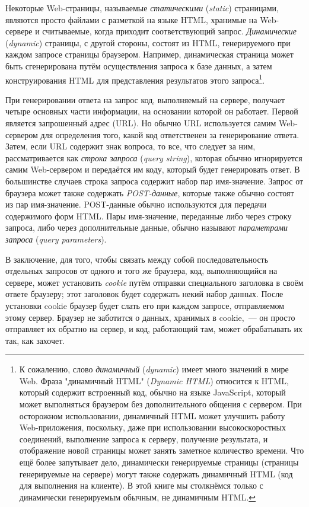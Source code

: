 Некоторые Web-страницы, называемые \textit{статическими} (\textit{static}) страницами,
являются просто файлами с разметкой на языке HTML, хранимые на Web-сервере и считываемые,
когда приходит соответствующий запрос. \textit{Динамические} (\textit{dynamic}) страницы,
с другой стороны, состоят из HTML, генерируемого при каждом запросе страницы
браузером. Например, динамическая страница может быть сгенерирована путём осуществления
запроса к базе данных, а затем конструирования HTML для представления результатов этого
запроса\footnote{К сожалению, слово \textit{динамичный} (\textit{dynamic}) имеет много
  значений в мире Web. Фраза "динамичный HTML" (\textit{Dynamic HTML}) относится к HTML,
  который содержит встроенный код, обычно на языке JavaScript, который может выполняться
  браузером без дополнительного общения с сервером. При осторожном использовании,
  динамичный HTML может улучшить работу Web-приложения, поскольку, даже при использовании
  высокоскоростных соединений, выполнение запроса к серверу, получение результата, и
  отображение новой страницы может занять заметное количество времени. Что ещё более
  запутывает дело, динамически генерируемые страницы (страницы генерируемые на сервере)
  могут также содержать динамичный HTML (код для выполнения на клиенте). В этой книге мы
  столкнёмся только с динамически генерируемым обычным, не динамичным HTML.}.

При генерировании ответа на запрос код, выполняемый на сервере, получает четыре основных
части информации, на основании которой он работает. Первой является запрошенный адрес
(URL). Но обычно URL используется самим Web-сервером для определения того, какой код
ответственен за генерирование ответа. Затем, если URL содержит знак вопроса, то все, что
следует за ним, рассматривается как \textit{строка запроса} (\textit{query string}),
которая обычно игнорируется самим Web-сервером и передаётся им коду, который будет
генерировать ответ. В большинстве случаев строка запроса содержит набор пар
имя-значение. Запрос от браузера может также содержать \textit{POST-данные}, которые также
обычно состоят из пар имя-значение. POST-данные обычно используются для передачи
содержимого форм HTML. Пары имя-значение, переданные либо через строку запроса, либо через
дополнительные данные, обычно называют \textit{параметрами запроса} (\textit{query
  parameters}).

В заключение, для того, чтобы связать между собой последовательность отдельных запросов от
одного и того же браузера, код, выполняющийся на сервере, может установить \textit{cookie}
путём отправки специального заголовка в своём ответе браузеру; этот заголовок будет
содержать некий набор данных. После установки cookie браузер будет слать его при каждом
запросе, отправляемом этому сервер. Браузер не заботится о данных, хранимых в cookie,~---
он просто отправляет их обратно на сервер, и код, работающий там, может обрабатывать их
так, как захочет.

